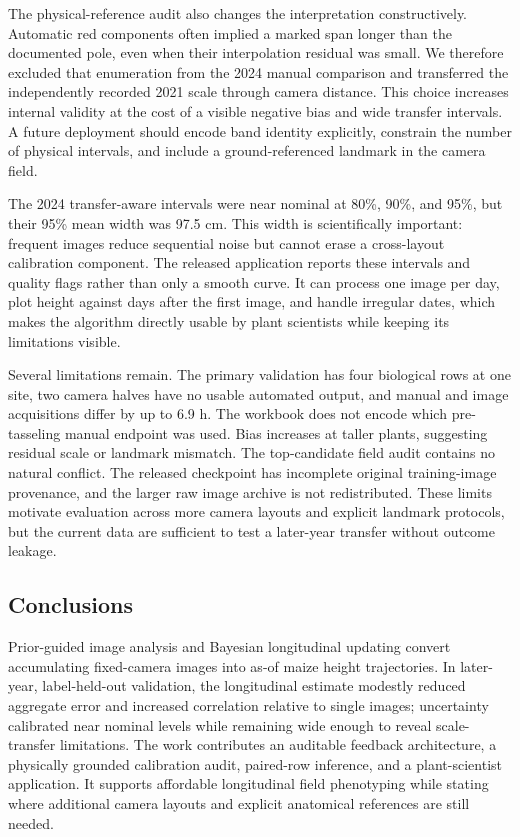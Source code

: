 \documentclass[review,12pt,authoryear]{elsarticle}
\begin{document}
The physical-reference audit also changes the interpretation constructively. Automatic red components often implied a marked span longer than the documented pole, even when their interpolation residual was small. We therefore excluded that enumeration from the 2024 manual comparison and transferred the independently recorded 2021 scale through camera distance. This choice increases internal validity at the cost of a visible negative bias and wide transfer intervals. A future deployment should encode band identity explicitly, constrain the number of physical intervals, and include a ground-referenced landmark in the camera field.

The 2024 transfer-aware intervals were near nominal at 80\%, 90\%, and 95\%, but their 95\% mean width was 97.5 cm. This width is scientifically important: frequent images reduce sequential noise but cannot erase a cross-layout calibration component. The released application reports these intervals and quality flags rather than only a smooth curve. It can process one image per day, plot height against days after the first image, and handle irregular dates, which makes the algorithm directly usable by plant scientists while keeping its limitations visible.

Several limitations remain. The primary validation has four biological rows at one site, two camera halves have no usable automated output, and manual and image acquisitions differ by up to 6.9 h. The workbook does not encode which pre-tasseling manual endpoint was used. Bias increases at taller plants, suggesting residual scale or landmark mismatch. The top-candidate field audit contains no natural conflict. The released checkpoint has incomplete original training-image provenance, and the larger raw image archive is not redistributed. These limits motivate evaluation across more camera layouts and explicit landmark protocols, but the current data are sufficient to test a later-year transfer without outcome leakage.

\subsection{Conclusions}

Prior-guided image analysis and Bayesian longitudinal updating convert accumulating fixed-camera images into as-of maize height trajectories. In later-year, label-held-out validation, the longitudinal estimate modestly reduced aggregate error and increased correlation relative to single images; uncertainty calibrated near nominal levels while remaining wide enough to reveal scale-transfer limitations. The work contributes an auditable feedback architecture, a physically grounded calibration audit, paired-row inference, and a plant-scientist application. It supports affordable longitudinal field phenotyping while stating where additional camera layouts and explicit anatomical references are still needed.
\end{document}
